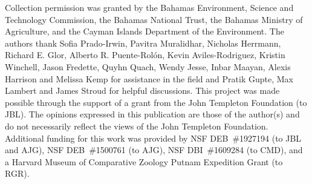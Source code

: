 Collection permission was granted by the Bahamas Environment, Science and Technology Commission, the Bahamas National Trust, the Bahamas Ministry of Agriculture, and the Cayman Islands Department of the Environment. The authors thank Sofia Prado-Irwin, Pavitra Muralidhar, Nicholas Herrmann, Richard E. Glor, Alberto R. Puente-Rol\'{o}n, Kevin Aviles-Rodriguez, Kristin Winchell, Jason Fredette, Quyhn Quach, Wendy Jesse, Inbar Maayan, Alexis Harrison and Melissa Kemp for assistance in the field and Pratik Gupte, Max Lambert and James Stroud for helpful discussions. This project was made possible through the support of a grant from the John Templeton Foundation (to JBL). The opinions expressed in this publication are those of the author(s) and do not necessarily reflect the views of the John Templeton Foundation. Additional funding for this work was provided by NSF DEB~\#1927194 (to JBL and AJG), NSF DEB~\#1500761 (to AJG), NSF DBI~\#1609284 (to CMD), and a Harvard Museum of Comparative Zoology Putnam Expedition Grant (to RGR).

